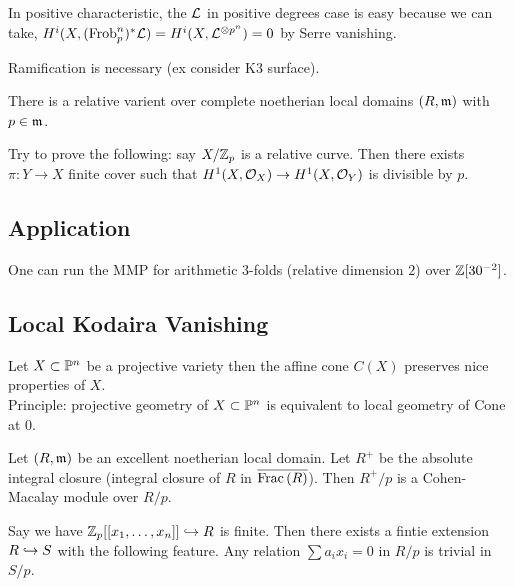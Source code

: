 \documentclass[12pt]{article}
\newcommand{\Frob}{\mathrm{Frob}}
\begin{document}
\begin{rmk}
In positive characteristic, the $\L$ in positive degrees case is easy because we can take, $H^i(X, (\Frob_p^n)^* \L) = H^i(X, \L^{\ot p^n}) = 0$ by Serre vanishing. 
\end{rmk}

\begin{rmk}
Ramification is necessary (ex consider K3 surface).
\end{rmk}

\begin{rmk}
There is a relative varient over complete noetherian local domains $(R, \m)$ with $p \in \m$.
\end{rmk}

\begin{rmk}
Try to prove the following: say $X / \ZZ_p$ is a relative curve. Then there exists $\pi : Y \to X$ finite cover such that $H^1(X, \struct{X}) \to H^1(X, \struct{Y})$ is divisible by $p$. 
\end{rmk}

\subsection{Application}

\begin{theorem}[BMPSTWW, TY]
One can run the MMP for arithmetic 3-folds (relative dimension $2$) over $\Z[30^{-2}]$.
\end{theorem}

\subsection{Local Kodaira Vanishing}

Let $X \subset \P^n$ be a projective variety then the affine cone $C(X)$ preserves nice properties of $X$.
\bigskip\\
Principle: projective geometry of $X \subset \P^n$ is equivalent to local geometry of Cone at $0$.

\begin{theorem}
Let $(R, \m)$ be an excellent noetherian local domain. Let $R^+$ be the absolute integral closure (integral closure of $R$ in $\overline{\Frac{R}}$). Then $R^+ / p$ is a Cohen-Macalay module over $R/p$.
\end{theorem}

\begin{rmk}
Say we have $\Z_p[[x_1, \dots, x_n]] \embed R$ is finite. Then there exists a fintie extension $R \embed S$ with the following feature. Any relation $\sum a_i x_i = 0$ in $R/p$ is trivial in $S/p$.
\end{rmk}
\end{document}

